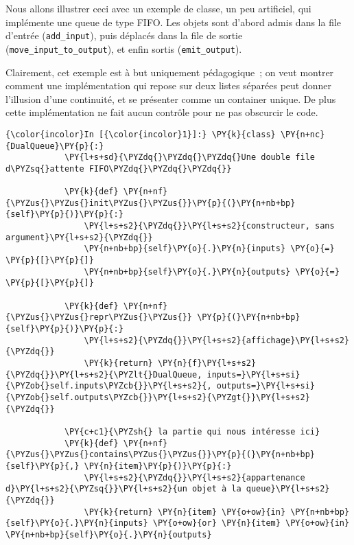     Nous allons illustrer ceci avec un exemple de classe, un peu artificiel,
qui implémente une queue de type FIFO. Les objets sont d'abord admis
dans la file d'entrée (\texttt{add\_input}), puis déplacés dans la file
de sortie (\texttt{move\_input\_to\_output}), et enfin sortis
(\texttt{emit\_output}).

Clairement, cet exemple est à but uniquement pédagogique~; on veut
montrer comment une implémentation qui repose sur deux listes séparées
peut donner l'illusion d'une continuité, et se présenter comme un
container unique. De plus cette implémentation ne fait aucun contrôle
pour ne pas obscurcir le code.

    \begin{Verbatim}[commandchars=\\\{\},frame=single,framerule=0.3mm,rulecolor=\color{cellframecolor}]
{\color{incolor}In [{\color{incolor}1}]:} \PY{k}{class} \PY{n+nc}{DualQueue}\PY{p}{:}
            \PY{l+s+sd}{\PYZdq{}\PYZdq{}\PYZdq{}Une double file d\PYZsq{}attente FIFO\PYZdq{}\PYZdq{}\PYZdq{}}
        
            \PY{k}{def} \PY{n+nf}{\PYZus{}\PYZus{}init\PYZus{}\PYZus{}}\PY{p}{(}\PY{n+nb+bp}{self}\PY{p}{)}\PY{p}{:}
                \PY{l+s+s2}{\PYZdq{}}\PY{l+s+s2}{constructeur, sans argument}\PY{l+s+s2}{\PYZdq{}}
                \PY{n+nb+bp}{self}\PY{o}{.}\PY{n}{inputs} \PY{o}{=} \PY{p}{[}\PY{p}{]}
                \PY{n+nb+bp}{self}\PY{o}{.}\PY{n}{outputs} \PY{o}{=} \PY{p}{[}\PY{p}{]}
        
            \PY{k}{def} \PY{n+nf}{\PYZus{}\PYZus{}repr\PYZus{}\PYZus{}} \PY{p}{(}\PY{n+nb+bp}{self}\PY{p}{)}\PY{p}{:}
                \PY{l+s+s2}{\PYZdq{}}\PY{l+s+s2}{affichage}\PY{l+s+s2}{\PYZdq{}}
                \PY{k}{return} \PY{n}{f}\PY{l+s+s2}{\PYZdq{}}\PY{l+s+s2}{\PYZlt{}DualQueue, inputs=}\PY{l+s+si}{\PYZob{}self.inputs\PYZcb{}}\PY{l+s+s2}{, outputs=}\PY{l+s+si}{\PYZob{}self.outputs\PYZcb{}}\PY{l+s+s2}{\PYZgt{}}\PY{l+s+s2}{\PYZdq{}}
        
            \PY{c+c1}{\PYZsh{} la partie qui nous intéresse ici}
            \PY{k}{def} \PY{n+nf}{\PYZus{}\PYZus{}contains\PYZus{}\PYZus{}}\PY{p}{(}\PY{n+nb+bp}{self}\PY{p}{,} \PY{n}{item}\PY{p}{)}\PY{p}{:}
                \PY{l+s+s2}{\PYZdq{}}\PY{l+s+s2}{appartenance d}\PY{l+s+s2}{\PYZsq{}}\PY{l+s+s2}{un objet à la queue}\PY{l+s+s2}{\PYZdq{}}
                \PY{k}{return} \PY{n}{item} \PY{o+ow}{in} \PY{n+nb+bp}{self}\PY{o}{.}\PY{n}{inputs} \PY{o+ow}{or} \PY{n}{item} \PY{o+ow}{in} \PY{n+nb+bp}{self}\PY{o}{.}\PY{n}{outputs}
            

\end{Verbatim}
